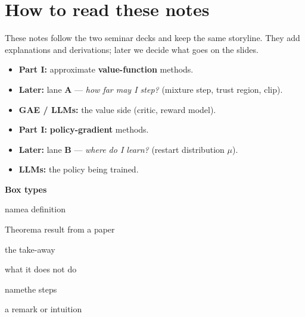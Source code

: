 \section*{How to read these notes}

These notes follow the two seminar decks and keep the same storyline. They add explanations and derivations; later we decide what goes on the slides.

\begin{pair}
\begin{warmbox}[title={Warm (copper)}]
\small
\begin{itemize}
  \item \textbf{Part I:} approximate \textbf{value-function} methods.
  \item \textbf{Later:} lane \textbf{A} --- \emph{how far may I step?} (mixture step, trust region, clip).
  \item \textbf{GAE / LLMs:} the value side (critic, reward model).
\end{itemize}
\end{warmbox}
\begin{coolbox}[title={Cool (blue)}]
\small
\begin{itemize}
  \item \textbf{Part I:} \textbf{policy-gradient} methods.
  \item \textbf{Later:} lane \textbf{B} --- \emph{where do I learn?} (restart distribution $\mu$).
  \item \textbf{LLMs:} the policy being trained.
\end{itemize}
\end{coolbox}
\end{pair}

\textbf{Box types}

\begin{pair}[3]
\begin{defbox}{name}\small a definition\end{defbox}
\begin{thmbox}{Theorem}\small a result from a paper\end{thmbox}
\begin{keybox}\small the take-away\end{keybox}
\begin{warnbox}\small what it does not do\end{warnbox}
\begin{algbox}{name}\small the steps\end{algbox}
\begin{notebox}\small a remark or intuition\end{notebox}
\end{pair}

